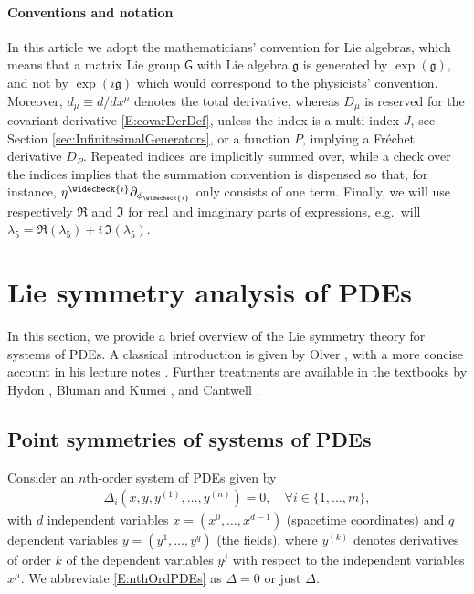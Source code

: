 \documentclass[a4paper,hidelinks, 12pt]{article}
\numberwithin{equation}{section}
\theoremstyle{plain}
\newcommand{\La}{\mathfrak}
\newcommand{\Lg}{\mathsf}
\begin{document}
\paragraph{Conventions and notation}
\label{sec:ConventionsAndNotation}
In this article we adopt the mathematicians' convention for Lie algebras, which means that a matrix Lie group $\Lg{G}$ with Lie algebra $\La{g}$
is generated by $\exp(\La{g})$, and not by 
$\exp(i\La{g})$ which would correspond to the physicists' convention. Moreover, 
$d_\mu\equiv d/dx^\mu$ denotes the total derivative, whereas 
$D_\mu$ is reserved for the covariant derivative \eqref{E:covarDerDef}, unless the index is a multi-index $J$, see Section \ref{sec:InfinitesimalGenerators}, or a function $P$, implying a Fréchet derivative $D_P$. Repeated indices are implicitly summed over,
while a check %
over the indices implies that the summation convention is dispensed so that, 
for instance, $\eta^{\widecheck{\imath}} \partial_{\phi_{\widecheck{\imath}}}$ only consists of one term. 
Finally, we will use
respectively $\Re$ and $\Im$ for real and imaginary parts of expressions, e.g.~will $\lambda_5=\Re(\lambda_5)+i\, \Im(\lambda_5)$.
\section{Lie symmetry analysis of PDEs}
\label{sec:LieSymmetryAnalysisOfPDEs}
In this section, we provide a brief overview of the Lie symmetry theory
for systems of PDEs. A classical introduction is given by Olver
\cite{olver1998applications}, with a more concise account in his lecture
notes \cite{OlverLecturesLGaDE}. Further treatments are available in the
textbooks by Hydon \cite{hydon2000symmetry}, Bluman and Kumei
\cite{bluman2010applications}, and Cantwell \cite{cantwell2002introduction}.



\subsection{Point symmetries of systems of PDEs}
\label{sec:PointSymmetriesOfSystemsOfPDEs}

Consider an $n$th-order system of PDEs given by
\begin{align}\label{E:nthOrdPDEs}
	\Delta_i(x,y,y^{(1)},\ldots, y^{(n)})=0, \quad \forall i\in \{1,\ldots,m\}, 
\end{align}
with $d$ independent variables $x=(x^0,\ldots, x^{d-1})$ (spacetime coordinates) and
$q$ dependent variables $y=(y^1,\ldots,y^q)$ (the fields), where
$y^{(k)}$ denotes derivatives of order $k$ of the dependent variables $y^j$ with respect to the independent variables $x^\mu$. We abbreviate \eqref{E:nthOrdPDEs} as $\Delta=0$ or just $\Delta$.
\end{document}
